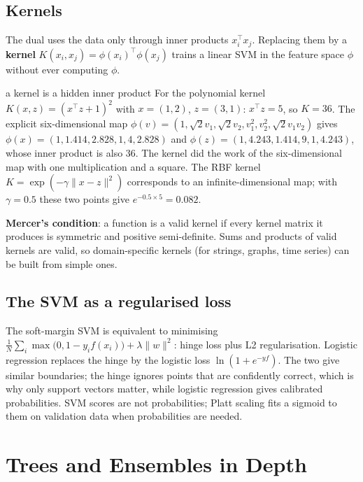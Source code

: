 \documentclass[11pt]{article}
\begin{document}
\subsection{Kernels}
The dual uses the data only through inner products $x_i^\top x_j$. Replacing them by a \textbf{kernel} $K(x_i,x_j)=\phi(x_i)^\top\phi(x_j)$ trains a linear SVM in the feature space $\phi$ without ever computing $\phi$.
\begin{example}{a kernel is a hidden inner product}
For the polynomial kernel $K(x,z)=(x^\top z+1)^2$ with $x=(1,2)$, $z=(3,1)$: $x^\top z=5$, so $K=36$. The explicit six-dimensional map $\phi(v)=(1,\sqrt2v_1,\sqrt2v_2,v_1^2,v_2^2,\sqrt2v_1v_2)$ gives $\phi(x)=(1,1.414,2.828,1,4,2.828)$ and $\phi(z)=(1,4.243,1.414,9,1,4.243)$, whose inner product is also 36. The kernel did the work of the six-dimensional map with one multiplication and a square. The RBF kernel $K=\exp(-\gamma\|x-z\|^2)$ corresponds to an infinite-dimensional map; with $\gamma=0.5$ these two points give $e^{-0.5\times5}=0.082$.
\end{example}
\textbf{Mercer's condition}: a function is a valid kernel if every kernel matrix it produces is symmetric and positive semi-definite. Sums and products of valid kernels are valid, so domain-specific kernels (for strings, graphs, time series) can be built from simple ones.
\subsection{The SVM as a regularised loss}
The soft-margin SVM is equivalent to minimising $\frac1N\sum_i\max\big(0,1-y_if(x_i)\big)+\lambda\|w\|^2$: hinge loss plus L2 regularisation. Logistic regression replaces the hinge by the logistic loss $\ln(1+e^{-yf})$. The two give similar boundaries; the hinge ignores points that are confidently correct, which is why only support vectors matter, while logistic regression gives calibrated probabilities. SVM scores are not probabilities; Platt scaling fits a sigmoid to them on validation data when probabilities are needed.

\section{Trees and Ensembles in Depth}
\end{document}
